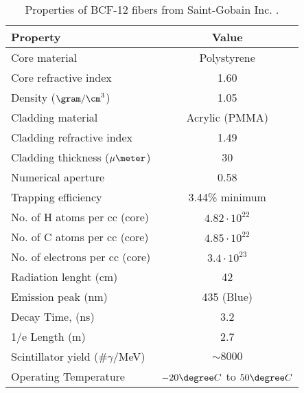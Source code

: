 \begin{table}[htbp]
\centering{}%
\begin{tabular}{lc}
\toprule 
Property & Value \tabularnewline
\midrule
\midrule 
Core material & Polystyrene \tabularnewline
Core refractive index & 1.60 \tabularnewline
Density ($\gram/\cm^3$) & 1.05 \tabularnewline
Cladding material & Acrylic (PMMA) \tabularnewline
Cladding refractive index & 1.49 \tabularnewline
Cladding thickness ($\mu\meter$) & 30 \tabularnewline
Numerical aperture & 0.58 \tabularnewline
Trapping efficiency & 3.44\% minimum \tabularnewline
No. of H atoms per cc (core) & $4.82 \cdot{} 10^{22}$ \tabularnewline
No. of C atoms per cc (core) & $4.85 \cdot{} 10^{22}$ \tabularnewline
No. of electrons per cc (core) & $3.4 \cdot{} 10^{23}$ \tabularnewline
Radiation lenght (cm) & 42 \tabularnewline
Emission peak (nm) & 435 (Blue) \tabularnewline
Decay Time, (ns) & 3.2 \tabularnewline
1/e Length (m) & 2.7 \tabularnewline
Scintillator yield (\#$\gamma$/MeV) & $\sim 8000$ \tabularnewline
Operating Temperature & $-20\degree C$ to $50\degree C$ \tabularnewline
\bottomrule
\end{tabular}
\caption{Properties of BCF-12 fibers from Saint-Gobain Inc. \cite{DataSheetBCF12Fiber}.}
\label{tab:ParametersFibersBCF12}
\end{table}